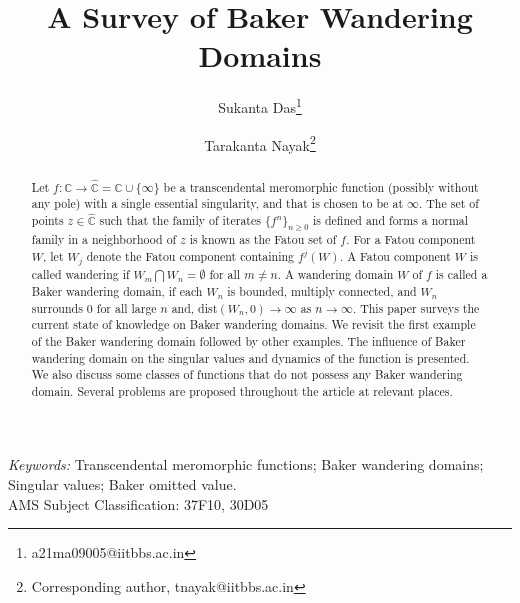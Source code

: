\documentclass[11pt,a4paper]{article}
\begin{document}
 
	\title{\textbf{A Survey of Baker Wandering Domains}}
	\author{Sukanta Das\footnote{a21ma09005@iitbbs.ac.in}}
	\author[2]{Tarakanta Nayak\footnote{Corresponding author, tnayak@iitbbs.ac.in}}
	\date{}
	\maketitle
	\begin{abstract}
		Let $f:\mathbb C\to \widehat{\mathbb C}=\mathbb C \cup\{\infty\}$ be a transcendental meromorphic function (possibly without any pole) with a single essential singularity, and that is chosen to be at $\infty$. The set of points $z\in\mathbb{{\widehat{C}}}$ such that the family of iterates $\{f^n\}_{n\geq 0}$ is defined and forms a normal family in a neighborhood of $z$ is known as the Fatou set of $f$. For a Fatou component $W$, let   $W_j$ denote  the Fatou component containing $f^j(W)$. A Fatou component $W$ is called wandering if $W_m\bigcap W_n=\emptyset$ for all $m \neq n$.  A wandering domain $W$ of  $f$ is called a Baker wandering domain, if each $W_n$ is bounded, multiply connected, and $W_n$ surrounds $0$ for all large $n$ and, dist$(W_n,0)\to\infty$ as $n\to\infty$.
		This paper surveys the current state of knowledge on Baker wandering domains. We revisit the first example of the Baker wandering domain followed by other examples. The influence of Baker wandering domain on the singular values and dynamics of the function is presented.  We also  discuss some classes of functions that do not possess any Baker wandering domain. Several problems are proposed throughout the article at relevant places.
	\end{abstract}
	\textit{Keywords:}
	Transcendental meromorphic functions; Baker wandering domains; Singular values; Baker omitted value.\\
	
	AMS Subject Classification: 37F10, 30D05
	
\end{document}
